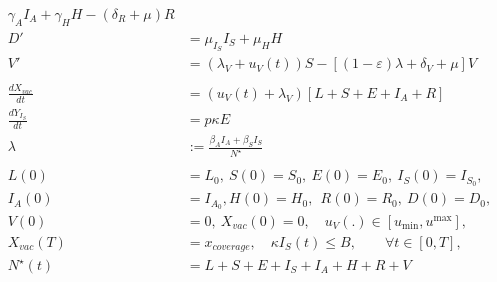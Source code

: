 \begin{equation}
\begin{aligned}
                \gamma_A I_A +
                \gamma_H H %
                - (\delta_R + \mu) R
        \\
            D' &=
                \mu_{I_S} I_S + \mu_H H
        \\
            V' &=
                (\lambda_V + u_V(t)) S
                - \left[
                (1 - \varepsilon) \lambda
                + \delta_V
                + \mu
                \right ] V
        \\
        \\
            \frac{dX_{vac}}{dt}
                &=
                (u_V(t) + \lambda_V)
                \left[
                    L + S + E + I_A + R
                \right]
        \\
            \frac{d Y_{I_S}}{dt}
                & = p \kappa E
        \\
            \lambda &:=
                \frac{\beta_A I_A + \beta_S I_S}{N^{\star}}
        \\
        \\
            L(0) &= L_0,
            \ S(0) = S_0,
            \ E(0) = E_0,
            \ I_S(0) = I_{S_{0}},
      \\
            I_A(0) &= I_{A_{0}},
            H(0) = H_0, \
            \ R(0) = R_0, \ D(0) = D_0,
      \\
            V(0) &= 0, \ X_{vac}(0) = 0, \quad
            u_V(.) \in [u_{\min}, u^{\max}],
      \\
            X_{vac}(T) &= x_{coverage},
      \quad
            \kappa I_S(t) \leq B, \qquad
            \forall t \in [0, T],
      \\
            N^{\star}(t) &=
                L + S +E + I_S + I_A +
                H + R + V
        \end{aligned}
\end{equation}
